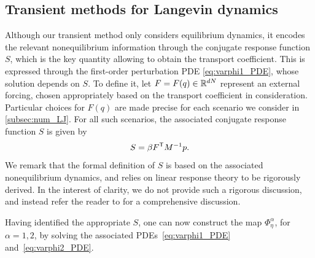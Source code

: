 %
\subsection{Transient methods for Langevin dynamics}
\label{subsec:num_lang}
%
%
Although our transient method only considers equilibrium dynamics, it encodes the relevant nonequilibrium information through the conjugate  response function $S$, which is the key quantity allowing to obtain the transport coefficient. This is expressed through the first-order perturbation PDE \eqref{eq:varphi1_PDE}, whose solution depends on $S$. To define it, let $F = F(q) \in \mathbb{R}^{dN}$ represent an external forcing, chosen appropriately based on the transport coefficient in consideration.  Particular choices for $F(q)$ are made precise for each scenario we consider in \cref{subsec:num_LJ}. For all such scenarios, the associated conjugate response function $S$ is given by
%
\begin{equation}
    S = \beta F^\mathsf T M^{-1} p.
    \label{eq:conj_res}
\end{equation}
%
We remark that the formal definition of $S$ is based on the associated nonequilibrium dynamics, and relies on linear response theory to be rigorously derived. In the interest of clarity, we do not provide such a rigorous discussion, and instead refer the reader to \cite[Section 5.2.3]{acta_numerica2016} for a comprehensive discussion.

Having identified the appropriate $S$, one can now construct the map $\Phi_\eta^\alpha$, for $\alpha=1,2$, by solving the associated PDEs~\eqref{eq:varphi1_PDE} and~\eqref{eq:varphi2_PDE}. 
%
%

